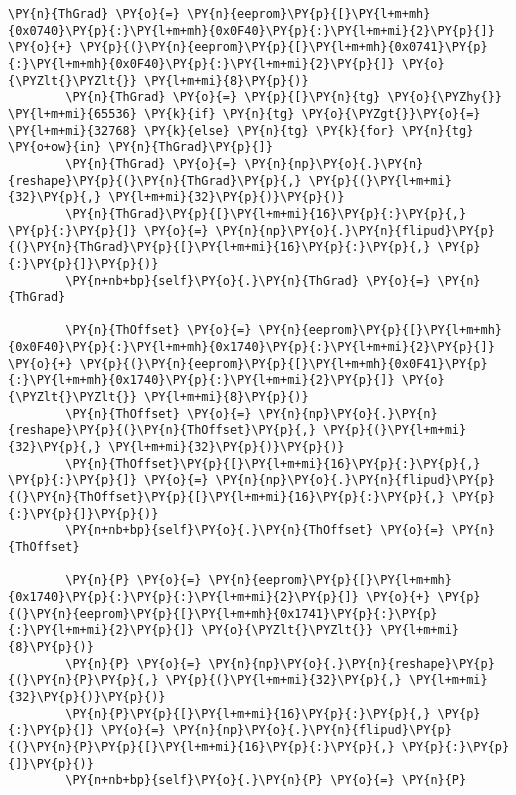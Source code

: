 \begin{tcolorbox}[breakable, size=fbox, boxrule=1pt, pad at break*=1mm,colback=cellbackground, colframe=cellborder]
\begin{Verbatim}[commandchars=\\\{\}]
		\PY{n}{ThGrad} \PY{o}{=} \PY{n}{eeprom}\PY{p}{[}\PY{l+m+mh}{0x0740}\PY{p}{:}\PY{l+m+mh}{0x0F40}\PY{p}{:}\PY{l+m+mi}{2}\PY{p}{]} \PY{o}{+} \PY{p}{(}\PY{n}{eeprom}\PY{p}{[}\PY{l+m+mh}{0x0741}\PY{p}{:}\PY{l+m+mh}{0x0F40}\PY{p}{:}\PY{l+m+mi}{2}\PY{p}{]} \PY{o}{\PYZlt{}\PYZlt{}} \PY{l+m+mi}{8}\PY{p}{)}
		\PY{n}{ThGrad} \PY{o}{=} \PY{p}{[}\PY{n}{tg} \PY{o}{\PYZhy{}} \PY{l+m+mi}{65536} \PY{k}{if} \PY{n}{tg} \PY{o}{\PYZgt{}}\PY{o}{=} \PY{l+m+mi}{32768} \PY{k}{else} \PY{n}{tg} \PY{k}{for} \PY{n}{tg} \PY{o+ow}{in} \PY{n}{ThGrad}\PY{p}{]}
		\PY{n}{ThGrad} \PY{o}{=} \PY{n}{np}\PY{o}{.}\PY{n}{reshape}\PY{p}{(}\PY{n}{ThGrad}\PY{p}{,} \PY{p}{(}\PY{l+m+mi}{32}\PY{p}{,} \PY{l+m+mi}{32}\PY{p}{)}\PY{p}{)}
		\PY{n}{ThGrad}\PY{p}{[}\PY{l+m+mi}{16}\PY{p}{:}\PY{p}{,} \PY{p}{:}\PY{p}{]} \PY{o}{=} \PY{n}{np}\PY{o}{.}\PY{n}{flipud}\PY{p}{(}\PY{n}{ThGrad}\PY{p}{[}\PY{l+m+mi}{16}\PY{p}{:}\PY{p}{,} \PY{p}{:}\PY{p}{]}\PY{p}{)}
		\PY{n+nb+bp}{self}\PY{o}{.}\PY{n}{ThGrad} \PY{o}{=} \PY{n}{ThGrad}

		\PY{n}{ThOffset} \PY{o}{=} \PY{n}{eeprom}\PY{p}{[}\PY{l+m+mh}{0x0F40}\PY{p}{:}\PY{l+m+mh}{0x1740}\PY{p}{:}\PY{l+m+mi}{2}\PY{p}{]} \PY{o}{+} \PY{p}{(}\PY{n}{eeprom}\PY{p}{[}\PY{l+m+mh}{0x0F41}\PY{p}{:}\PY{l+m+mh}{0x1740}\PY{p}{:}\PY{l+m+mi}{2}\PY{p}{]} \PY{o}{\PYZlt{}\PYZlt{}} \PY{l+m+mi}{8}\PY{p}{)}
		\PY{n}{ThOffset} \PY{o}{=} \PY{n}{np}\PY{o}{.}\PY{n}{reshape}\PY{p}{(}\PY{n}{ThOffset}\PY{p}{,} \PY{p}{(}\PY{l+m+mi}{32}\PY{p}{,} \PY{l+m+mi}{32}\PY{p}{)}\PY{p}{)}
		\PY{n}{ThOffset}\PY{p}{[}\PY{l+m+mi}{16}\PY{p}{:}\PY{p}{,} \PY{p}{:}\PY{p}{]} \PY{o}{=} \PY{n}{np}\PY{o}{.}\PY{n}{flipud}\PY{p}{(}\PY{n}{ThOffset}\PY{p}{[}\PY{l+m+mi}{16}\PY{p}{:}\PY{p}{,} \PY{p}{:}\PY{p}{]}\PY{p}{)}
		\PY{n+nb+bp}{self}\PY{o}{.}\PY{n}{ThOffset} \PY{o}{=} \PY{n}{ThOffset}

		\PY{n}{P} \PY{o}{=} \PY{n}{eeprom}\PY{p}{[}\PY{l+m+mh}{0x1740}\PY{p}{:}\PY{p}{:}\PY{l+m+mi}{2}\PY{p}{]} \PY{o}{+} \PY{p}{(}\PY{n}{eeprom}\PY{p}{[}\PY{l+m+mh}{0x1741}\PY{p}{:}\PY{p}{:}\PY{l+m+mi}{2}\PY{p}{]} \PY{o}{\PYZlt{}\PYZlt{}} \PY{l+m+mi}{8}\PY{p}{)}
		\PY{n}{P} \PY{o}{=} \PY{n}{np}\PY{o}{.}\PY{n}{reshape}\PY{p}{(}\PY{n}{P}\PY{p}{,} \PY{p}{(}\PY{l+m+mi}{32}\PY{p}{,} \PY{l+m+mi}{32}\PY{p}{)}\PY{p}{)}
		\PY{n}{P}\PY{p}{[}\PY{l+m+mi}{16}\PY{p}{:}\PY{p}{,} \PY{p}{:}\PY{p}{]} \PY{o}{=} \PY{n}{np}\PY{o}{.}\PY{n}{flipud}\PY{p}{(}\PY{n}{P}\PY{p}{[}\PY{l+m+mi}{16}\PY{p}{:}\PY{p}{,} \PY{p}{:}\PY{p}{]}\PY{p}{)}
		\PY{n+nb+bp}{self}\PY{o}{.}\PY{n}{P} \PY{o}{=} \PY{n}{P}


\end{Verbatim}
\end{tcolorbox}
